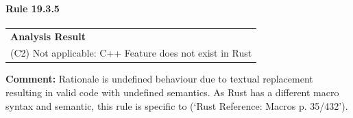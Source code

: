 \paragraph{Rule 19.3.5}
\begin{longtable}{p{13cm}}
\textbf{Analysis Result} \\
(C2) Not applicable: C++ Feature does not exist in Rust \\
\end{longtable}
\textbf{Comment:} Rationale is undefined behaviour due to textual replacement resulting in valid code with undefined semantics. As Rust has a different macro syntax and semantic, this rule is specific to \Cpp (`Rust Reference: Macros p. 35/432'). \\
